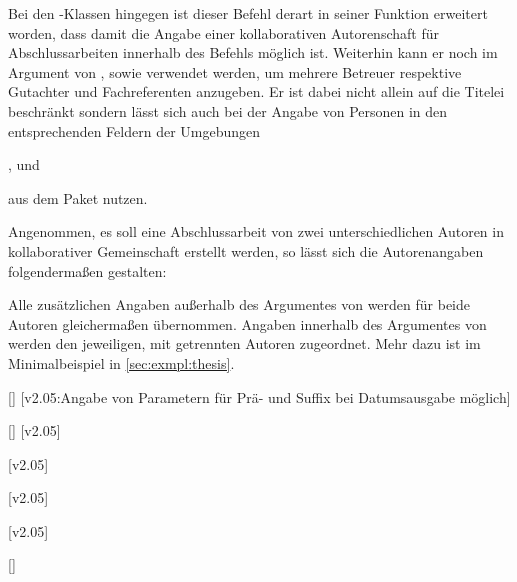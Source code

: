 \begin{DeclareEntity*}{}
\begin{DeclareEntity*}{}
\begin{DeclareEntity*}{}
\begin{Declaration}
Bei den \TUDScript-Klassen hingegen ist dieser Befehl derart in seiner Funktion 
erweitert worden, dass damit die Angabe einer kollaborativen Autorenschaft für 
Abschlussarbeiten innerhalb des Befehls  möglich ist. Weiterhin 
kann er noch im Argument von ,  sowie 
 verwendet werden, um mehrere Betreuer respektive Gutachter und 
Fachreferenten anzugeben. Er ist dabei nicht allein auf die Titelei beschränkt 
sondern lässt sich auch bei der Angabe von Personen in den entsprechenden 
Feldern der Umgebungen
\begin{Entity}{}
,  und 
\end{Entity}
aus dem Paket  nutzen.
\end{Declaration}
%
\begin{Example}
Angenommen, es soll eine Abschlussarbeit von zwei unterschiedlichen Autoren in 
kollaborativer Gemeinschaft erstellt werden, so lässt sich die Autorenangaben 
folgendermaßen gestalten:
\begin{Code}
\author{%
  Mickey Mouse%
\and%
  Donald Duck%
}
\end{Code}
Alle zusätzlichen Angaben außerhalb des Argumentes von  werden 
für beide Autoren gleichermaßen übernommen. Angaben innerhalb des Argumentes 
von  werden den jeweiligen, mit  getrennten Autoren 
zugeordnet. Mehr dazu ist im Minimalbeispiel in \autoref{sec:exmpl:thesis}.
\end{Example}

\begin{Declaration}
  {[]}
  [v2.05:Angabe von Parametern für Prä- und Suffix bei Datumsausgabe möglich]
\begin{Declaration}
  {[]}
  [v2.05]
\begin{Declaration}
  {}
  [v2.05]
\begin{Declaration}
  {}
  [v2.05]
\begin{Declaration}
  {}
  [v2.05]
\begin{Declaration}
  {[]}


\end{Declaration}
\end{Declaration}
\end{Declaration}
\end{Declaration}
\end{Declaration}
\end{Declaration}
\end{DeclareEntity*}
\end{DeclareEntity*}
\end{DeclareEntity*}
